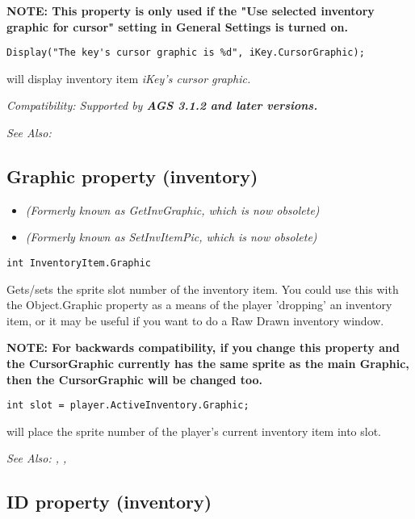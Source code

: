 \bf{NOTE:} This property is only used if the "Use selected inventory graphic for cursor"
setting in General Settings is turned on.

\begin{verbatim}
Display("The key's cursor graphic is %d", iKey.CursorGraphic);
\end{verbatim}
will display inventory item \it{iKey}'s cursor graphic.

\it{Compatibility:} Supported by \bf{AGS 3.1.2} and later versions.

\it{See Also:} 


\subsection{Graphic property (inventory)}\label{InventoryItem.Graphic}%

\begin{itemize}
\item \it{(Formerly known as GetInvGraphic, which is now obsolete)}
\item \it{(Formerly known as SetInvItemPic, which is now obsolete)}
\end{itemize}

\begin{verbatim}
int InventoryItem.Graphic
\end{verbatim}
Gets/sets the sprite slot number of the inventory item. You could use this
with the Object.Graphic property as a means of the player 'dropping' an inventory item, or
it may be useful if you want to do a Raw Drawn inventory window.

\bf{NOTE:} For backwards compatibility, if you change this property and the CursorGraphic
currently has the same sprite as the main Graphic, then the CursorGraphic will be changed
too.

\begin{verbatim}
int slot = player.ActiveInventory.Graphic;
\end{verbatim}
will place the sprite number of the player's current inventory item into slot.

\it{See Also:} ,
,


\subsection{ID property (inventory)}\label{InventoryItem.ID}%

